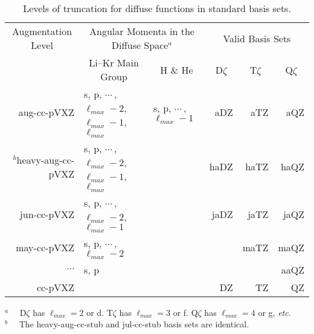 \begin{table}[!htbp]
\begin{footnotesize}
\caption{Levels of truncation for diffuse functions in standard basis sets. \label{table:basisMonths}}
\parsep 10pt
\begin{center}
\begin{tabular}{rllrrr}
\hline\hline
\multicolumn{1}{c}{Augmentation Level} &
\multicolumn{2}{c}{Angular Momenta in the Diffuse Space$^a$} &
\multicolumn{3}{c}{Valid Basis Sets} \\
\cline{2-3}\cline{4-6}
&
\multicolumn{1}{c}{Li--Kr Main Group} &
\multicolumn{1}{c}{H \& He} &
\multicolumn{1}{c}{D$\zeta$} &
\multicolumn{1}{c}{T$\zeta$} &
\multicolumn{1}{c}{Q$\zeta$} \\
\hline
aug-cc-pVXZ             & s, p, $\cdots\,$, $\ell_{max}-2$, $\ell_{max}-1$, $\ell_{max}$ & s, p, $\cdots\,$, $\ell_{max}-1$ &  aDZ &  aTZ &  aQZ \\
$^b$heavy-aug-cc-pVXZ   & s, p, $\cdots\,$, $\ell_{max}-2$, $\ell_{max}-1$, $\ell_{max}$ &                                  & haDZ & haTZ & haQZ \\
jun-cc-pVXZ             & s, p, $\cdots\,$, $\ell_{max}-2$, $\ell_{max}-1$               &                                  & jaDZ & jaTZ & jaQZ \\
may-cc-pVXZ             & s, p, $\cdots\,$, $\ell_{max}-2$                               &                                  &      & maTZ & maQZ \\
$\cdots$                & s, p                                                           &                                  &      &      & aaQZ \\
cc-pVXZ                 &                                                                &                                  &   DZ &   TZ &   QZ \\
\hline\hline
\end{tabular}
\end{center}
$^a\quad$ \mbox{D$\zeta$} has $\ell_{max}=2$ or d. \mbox{T$\zeta$} has $\ell_{max}=3$ or f. \mbox{Q$\zeta$} has $\ell_{max}=4$ or g, \textit{etc}. \\
$^b\quad$ The heavy-aug-cc-stub and jul-cc-stub basis sets are identical.
\end{footnotesize}
\end{table}



